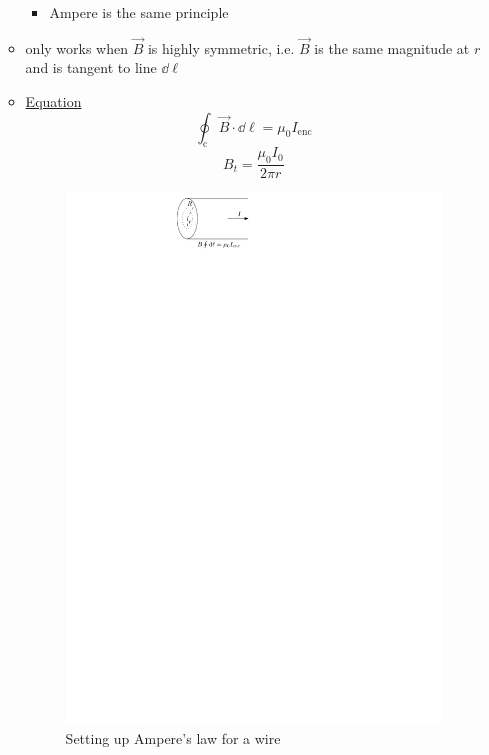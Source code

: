 \documentclass{article}
\begin{document}
\begin{itemize}
\begin{itemize}
\begin{itemize}
\begin{itemize}
              \end{itemize}
            \item Ampere is the same principle
          \end{itemize} 
          \item only works when $\vec{B}$ is highly symmetric, i.e. $\vec{B}$ is the same magnitude at $r$ and is tangent to line $\dd \ell$
          \item \underline{Equation} 
            $$
              \oint_{\mathrm{c}} \vec{B}\cdot \dd \ell = \mu_0 I_{\mathrm{enc}}
            $$
            $$
              B_t = \frac{\mu_0 I_0}{2\pi r}
            $$
          \begin{figure}[H]
            \centering
            \includegraphics{figures/ampere1.pdf}
            \caption{Setting up Ampere's law for a wire}
          \end{figure}

\end{itemize}
\end{itemize}
\end{document}
